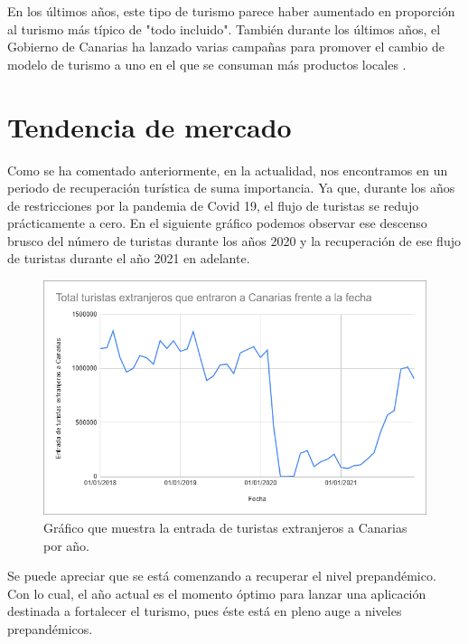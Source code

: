 En los últimos años, este tipo de turismo parece haber aumentado en proporción al turismo más típico de "todo incluido"\cite{turismotodoincluido}. También durante los últimos años, el Gobierno de Canarias ha lanzado varias campañas para promover el cambio de modelo de turismo a uno en el que se consuman más productos locales \cite{campañaelaboradoencanarias}.

\section{Tendencia de mercado}
Como se ha comentado anteriormente, en la actualidad, nos encontramos en un periodo de recuperación turística de suma importancia. Ya que, durante los años de restricciones por la pandemia de Covid 19, el flujo de turistas se redujo prácticamente a cero. En el siguiente gráfico podemos observar ese descenso brusco del número de turistas durante los años 2020 y la recuperación de ese flujo de turistas durante el año 2021 en adelante.

\begin{figure}[H]
    \centering
    \includegraphics[width=1\textwidth]{Memoria_TFG_LaTeX/images/turistas2018-2022.png}
    \caption{Gráfico que muestra la entrada de turistas extranjeros a Canarias por año.}
    \label{fig:turistas}
\end{figure}

Se puede apreciar que se está comenzando a recuperar el nivel prepandémico.
Con lo cual, el año actual es el momento óptimo para lanzar una aplicación destinada a fortalecer el turismo, pues éste está en pleno auge a niveles prepandémicos.

